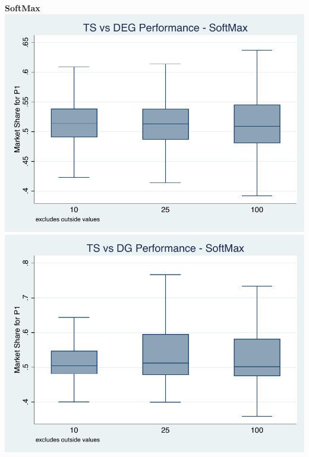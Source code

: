 \documentclass[11pt,letterpaper]{article}
\begin{document}
\pagebreak
\textbf{SoftMax} \\
\includegraphics[scale=1]{sm_ts_deg} \\
\includegraphics[scale=1]{sm_ts_dg}
\end{document}
